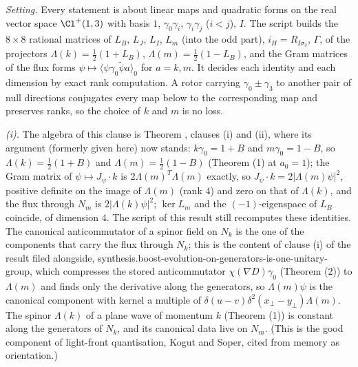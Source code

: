 \emph{Setting.} Every statement is about linear maps and quadratic forms on the real vector space $\Cl^{+}(1,3)$ with basis $1$, $\gamma_{0}\gamma_{i}$, $\gamma_{i}\gamma_{j}$ ($i < j$), $I$. The script builds the $8 \times 8$ rational matrices of $L_{B}$, $L_{J}$, $L_{I}$, $L_{m}$ (into the odd part), $i_{H} = R_{I\sigma_{3}}$, $\Gamma$, of the projectors $\Lambda(k) = \tfrac12(1 + L_{B})$, $\Lambda(m) = \tfrac12(1 - L_{B})$, and the Gram matrices of the flux forms $\psi \mapsto \langle\psi\gamma_{0}\tilde{\psi}a\rangle_{0}$ for $a = k, m$. It decides each identity and each dimension by exact rank computation. A rotor carrying $\gamma_{0} \pm \gamma_{3}$ to another pair of null directions conjugates every map below to the corresponding map and preserves ranks, so the choice of $k$ and $m$ is no loss.

\emph{(i).} The algebra of this clause is Theorem , clauses (i) and (ii), where its argument (formerly given here) now stands: $k\gamma_{0} = 1 + B$ and $m\gamma_{0} = 1 - B$, so $\Lambda(k) = \tfrac12(1 + B)$ and $\Lambda(m) = \tfrac12(1 - B)$ (Theorem (1) at $a_{0} = 1$); the Gram matrix of $\psi \mapsto J_{\psi}\cdot k$ is $2\Lambda(m)^{T}\Lambda(m)$ exactly, so $J_{\psi}\cdot k = 2|\Lambda(m)\psi|^{2}$, positive definite on the image of $\Lambda(m)$ (rank $4$) and zero on that of $\Lambda(k)$, and the flux through $N_{m}$ is $2|\Lambda(k)\psi|^{2}$; $\ker L_{m}$ and the $(-1)$-eigenspace of $L_{B}$ coincide, of dimension $4$. The script of this result still recomputes these identities. The canonical anticommutator of a spinor field on $N_{k}$ is the one of the components that carry the flux through $N_{k}$; this is the content of clause (i) of the result filed alongside, synthesis.boost-evolution-on-generators-is-one-unitary-group, which compresses the stored anticommutator $\chi(\nabla D)\gamma_{0}$ (Theorem (2)) to $\Lambda(m)$ and finds only the derivative along the generators, so $\Lambda(m)\psi$ is the canonical component with kernel a multiple of $\delta(u - v)\delta^{2}(x_{\perp} - y_{\perp})\Lambda(m)$. The spinor $\Lambda(k)$ of a plane wave of momentum $k$ (Theorem (1)) is constant along the generators of $N_{k}$, and its canonical data live on $N_{m}$. (This is the good component of light-front quantisation, Kogut and Soper, cited from memory as orientation.)

